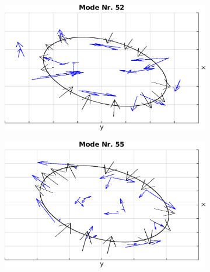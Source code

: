             \begin{figure}[!t]
              \centering
              \begin{subfigure}[t]{0.325\textwidth}
                \centering
                \includegraphics[width=\textwidth,height=0.7\textwidth]{figs/auswertung/manipulation/quadrupol3HzModeNr52.png}
              \end{subfigure}
              \begin{subfigure}[t]{0.325\textwidth}
                \centering
                \includegraphics[width=\textwidth,height=0.7\textwidth]{figs/auswertung/manipulation/quadrupol3HzModeNr55.png}
              \end{subfigure}
              \begin{subfigure}[t]{0.325\textwidth}
                \centering

\end{subfigure}
\end{figure}
